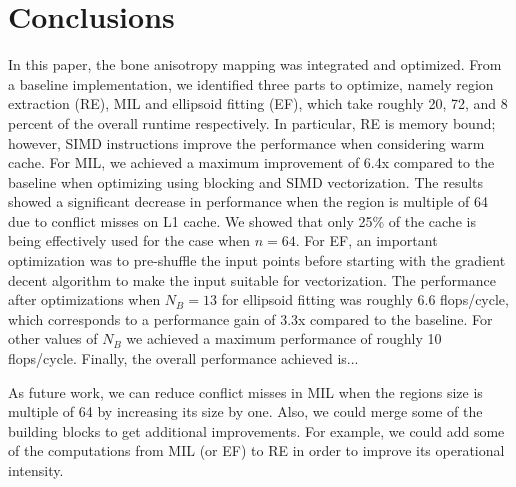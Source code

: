 \documentclass[letterpaper]{article}
\begin{document}
\section{Conclusions}
In this paper, the bone anisotropy mapping was integrated and optimized. From a baseline implementation, we identified three parts to optimize, namely region extraction (RE), MIL and ellipsoid fitting (EF), which take roughly 20, 72, and 8 percent of the overall runtime respectively. In particular, RE is memory bound; however, SIMD instructions improve the performance when considering warm cache. For MIL, we achieved a maximum improvement of 6.4x compared to the baseline when optimizing using blocking and SIMD vectorization. The results showed a significant decrease in performance when the region is multiple of 64 due to conflict misses on L1 cache. We showed that only 25\% of the cache is being effectively used for the case when $n = 64$. For EF, an important optimization was to pre-shuffle the input points before starting with the gradient decent algorithm  to make the input suitable for vectorization. The performance after optimizations when $N_B = 13$ for ellipsoid fitting was roughly 6.6 flops/cycle, which corresponds to a performance gain of 3.3x compared to the baseline. For other values of $N_B$ we achieved a maximum performance of roughly 10 flops/cycle. Finally, the overall performance achieved {\color{red}is...}

As future work, we can reduce conflict misses in MIL when the regions size is multiple of 64 by increasing its size by one. Also, we could merge some of the building blocks to get additional improvements. For example, we could add some of the computations from MIL (or EF) to RE in order to improve its operational intensity.


%

%



\end{document}
